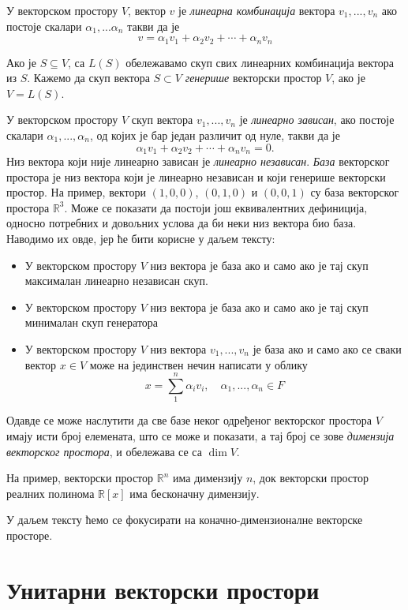 \documentclass{report}
\theoremstyle{plain}
\theoremstyle{definition}
\begin{document}
У векторском простору $V$, вектор $v$ је \emph{линеарна комбинација} вектора $v_1, ..., v_n$ ако постоје скалари $\alpha_1, ...\alpha_n$ такви да је $$v = \alpha_1 v_1+ \alpha_2 v_2+ \cdots+\alpha_n v_n$$

Ако је $S\subseteq V$, са $L(S)$ обележавамо скуп свих линеарних комбинација вектора из $S$. Кажемо да скуп вектора $S\subset V$ \emph{генерише} векторски простор $V$, ако је $V = L(S)$.

У векторском простору $V$ скуп вектора $v_1, ...,v_n$ је \emph{линеарно зависан}, ако постоје скалари $\alpha_1, ...,\alpha_n$, од којих је бар један различит од нуле, такви да је $$\alpha_1 v_1 + \alpha_2 v_2 + \cdots+\alpha_n v_n = 0.$$ Низ вектора који није линеарно зависан је \emph{линеарно независан}.
\emph{База} векторског простора је низ вектора који је линеарно независан и који генерише векторски простор.
На пример, вектори $(1, 0, 0)$, $(0, 1, 0)$ и $(0, 0, 1)$ су база векторског простора $\mathbb{R}^3$.
Може се показати да постоји још еквивалентних дефиниција, односно потребних и довољних услова да би неки низ вектора био база. Наводимо их овде, јер ће бити корисне у даљем тексту:
\begin{itemize}
  \item У векторском простору $V$ низ вектора је база ако и само ако је тај скуп максималан линеарно независан скуп.
  \item У векторском простору $V$ низ вектора је база ако и само ако је тај скуп минималан скуп генератора
  \item У векторском простору $V$ низ вектора $v_1, ..., v_n$ је база ако и само ако се сваки вектор $x\in V$ може на јединствен нечин написати у облику $$x = \sum_1^n\alpha_i v_i, \quad \alpha_1, ..., \alpha_n\in F$$
\end{itemize}
Одавде се може наслутити да све базе неког одређеног векторског простора $V$ имају исти број елемената, што се може и показати, а тај број се зове \emph{димензија векторског простора}, и обележава се са $\operatorname{dim} V$.

На пример, векторски простор $\mathbb{R}^n$ има димензију $n$, док векторски простор реалних полинома $\mathbb{R}[x]$ има бесконачну димензију.

У даљем тексту ћемо се фокусирати на коначно-димензионалне векторске просторе.

\section{Унитарни векторски простори}
\end{document}
